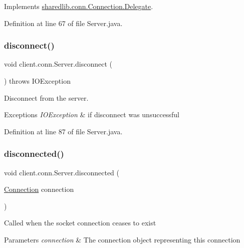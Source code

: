 Implements \hyperlink{interfacesharedlib_1_1conn_1_1_connection_1_1_delegate_acb701b2d46601fd448eba6c79b82694d}{sharedlib.\+conn.\+Connection.\+Delegate}.



Definition at line 67 of file Server.\+java.

\hypertarget{classclient_1_1conn_1_1_server_ab69a81693f41986321e92120aa0918cb}{}\label{classclient_1_1conn_1_1_server_ab69a81693f41986321e92120aa0918cb} 
\subsubsection{\texorpdfstring{disconnect()}{disconnect()}}
{\footnotesize\ttfamily void client.\+conn.\+Server.\+disconnect (\begin{DoxyParamCaption}{ }\end{DoxyParamCaption}) throws I\+O\+Exception}

Disconnect from the server. 
\begin{DoxyExceptions}{Exceptions}
{\em I\+O\+Exception} & if disconnect was unsuccessful \\
\hline
\end{DoxyExceptions}


Definition at line 87 of file Server.\+java.

\hypertarget{classclient_1_1conn_1_1_server_ae2a0ab226b1622da8e19137fb89bdc81}{}\label{classclient_1_1conn_1_1_server_ae2a0ab226b1622da8e19137fb89bdc81} 
\subsubsection{\texorpdfstring{disconnected()}{disconnected()}}
{\footnotesize\ttfamily void client.\+conn.\+Server.\+disconnected (\begin{DoxyParamCaption}\item[{\hyperlink{classsharedlib_1_1conn_1_1_connection}{Connection}}]{connection }\end{DoxyParamCaption})}

Called when the socket connection ceases to exist


\begin{DoxyParams}{Parameters}
{\em connection} & The connection object representing this connection \\
\hline
\end{DoxyParams}


